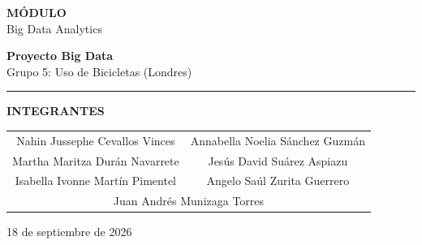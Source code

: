 \documentclass[12pt,a4paper]{article}
\begin{document}
\begin{titlepage}
\thispagestyle{empty}


\centering

\vspace*{3.2cm}
{\footnotesize\bfseries\color{blue!55!black} MÓDULO}\\[2pt]
{\large Big Data Analytics}

\vspace{1.4cm}
{\Huge\bfseries Proyecto Big Data}\\[6pt]
{\LARGE Grupo 5: Uso de Bicicletas (Londres)}

\vspace{0.4cm}
\textcolor{blue!55!black}{\rule{7cm}{0.9pt}}

\vspace{2.0cm}
{\small\bfseries\color{blue!55!black} INTEGRANTES}

\vspace{0.5cm}
\begin{tabular}{cc}
Nahin Jussephe Cevallos Vinces & Annabella Noelia Sánchez Guzmán \\[6pt]
Martha Maritza Durán Navarrete & Jesús David Suárez Aspiazu \\[6pt]
Isabella Ivonne Martín Pimentel & Angelo Saúl Zurita Guerrero \\[6pt]
\multicolumn{2}{c}{Juan Andrés Munizaga Torres}
\end{tabular}

\vfill

{\small 18 de septiembre de 2026}

\vspace{1.2cm}
\end{titlepage}

\newpage
\tableofcontents
\newpage














\end{document}
